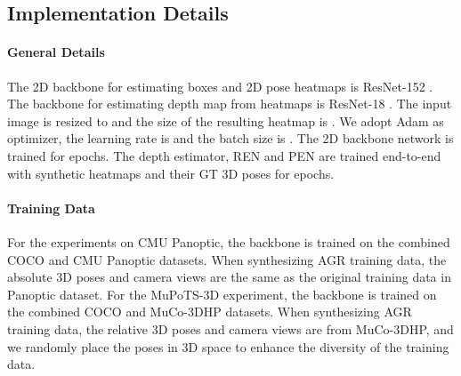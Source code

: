 \label{sec:experiments}

\subsection{Implementation Details}
\label{subsec:implementation}


\paragraph{\bf General Details}
The 2D backbone for estimating boxes and 2D pose heatmaps is ResNet-152 \cite{he2016deep}. The backbone for estimating depth map from heatmaps is ResNet-18 \cite{he2016deep}. The input image is resized to  and the size of the resulting heatmap is . We adopt Adam \cite{kingma2015adam} as optimizer, the learning rate is  and the batch size is . The 2D backbone network is trained for  epochs. The depth estimator, REN and PEN are trained end-to-end with synthetic heatmaps and their GT 3D poses for  epochs. 


\paragraph{\bf Training Data}
For the experiments on CMU Panoptic\cite{joo2015panoptic}, the backbone is trained on the combined COCO\cite{lin2014microsoft} and CMU Panoptic datasets. When synthesizing AGR training data, the absolute 3D poses and camera views are the same as the original training data in Panoptic dataset. For the MuPoTS-3D\cite{mehta2018single} experiment, the backbone is trained on the combined COCO and MuCo-3DHP\cite{mehta2018single} datasets. When synthesizing AGR training data, the relative 3D poses and camera views are from MuCo-3DHP, and we randomly place the poses in 3D space to enhance the diversity of the training data.



